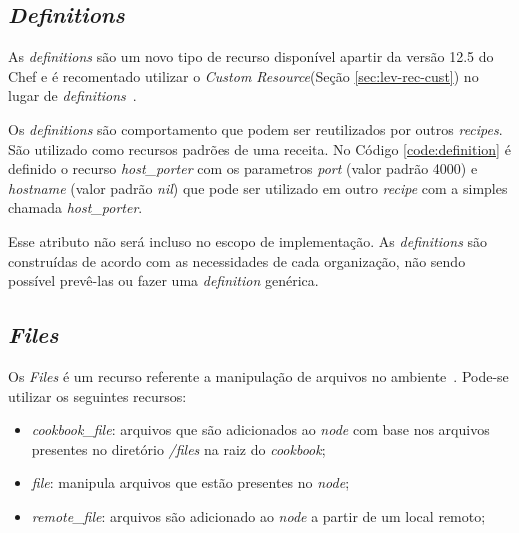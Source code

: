 \subsection{\textit{Definitions}}
\label{sec:lev-rec-def}

As \textit{definitions} são um novo tipo de recurso disponível apartir da versão
12.5 do Chef e é recomentado utilizar o \textit{Custom Resource}(Seção \ref{sec:lev-rec-cust})
no lugar de \textit{definitions}~\cite{chefdoc:2016}.

Os \textit{definitions} são comportamento que podem ser reutilizados por outros \textit{recipes}.
São utilizado como recursos padrões de uma receita. No Código \ref{code:definition}
é definido o recurso \textit{host\_porter} com os parametros \textit{port} (valor padrão 4000)
e \textit{hostname} (valor padrão \textit{nil}) que pode ser utilizado em outro
\textit{recipe} com a simples chamada \textit{host\_porter}.

\begin{minipage}{.90\textwidth}
  \lstset{style=shell}
  
\end{minipage}

Esse atributo não será incluso no escopo de implementação. As \textit{definitions} são
construídas de acordo com as necessidades de cada organização, não sendo
possível prevê-las ou fazer uma \textit{definition} genérica.

\subsection{\textit{Files}}
\label{sec:cbfiles}

Os \textit{Files} é um recurso referente a manipulação de arquivos no ambiente~\cite{chefdoc:2016}.
Pode-se utilizar os seguintes recursos:

\begin{itemize}
  \item \textit{cookbook\_file}: arquivos que são adicionados ao \textit{node} com base
    nos arquivos presentes no diretório \textit{/files} na raiz do \textit{cookbook};
  \item \textit{file}: manipula arquivos que estão presentes no \textit{node};
  \item \textit{remote\_file}: arquivos são adicionado ao \textit{node} a partir de um
    local remoto;
\end{itemize}

